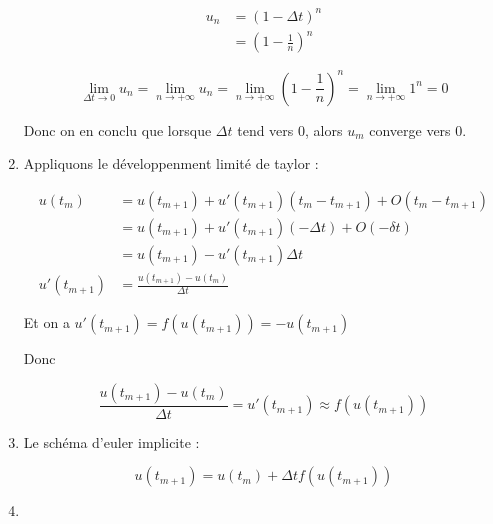 \documentclass[12pt, letterpaper]{article}
\begin{document}
\begin{enumerate}
  \begin{equation*}
    \begin{split}
      u_n & = ( 1 - \Delta t )^n \\
      & = \left( 1 - \frac{1}{n} \right)^n
    \end{split}
  \end{equation*}

  \begin{equation*}
    \lim_{\Delta t \rightarrow 0} {u_n}
    =
    \lim_{n \rightarrow +\infty} {u_n}
    =
    \lim_{n \rightarrow +\infty} {\left( 1 - \frac{1}{n} \right)^n}
    =
    \lim_{n \rightarrow +\infty} {1^n}
    =
    0
  \end{equation*}

  Donc on en conclu que lorsque $\Delta t$ tend vers 0, alors $u_m$
  converge vers 0.

\item

  Appliquons le développenment limité de taylor :

  \begin{equation*}
    \begin{split}
      u(t_m) & = u(t_{m + 1}) + u'(t_{m+1}) (t_m - t_{m+1}) + O(t_m -
      t_{m+1}) \\
      & = u(t_{m + 1}) + u'(t_{m+1}) (- \Delta t) + O(- \delta t) \\
      & = u(t_{m + 1}) - u'(t_{m+1}) \Delta t \\
      u'(t_{m+1}) & = \frac{u(t_{m + 1}) - u(t_m)}{\Delta t}
    \end{split}
  \end{equation*}

  Et on a $u'(t_{m+1}) = f(u(t_{m+1})) = - u(t_{m+1})$

  Donc

  \begin{equation*}
    \frac{u(t_{m + 1}) - u(t_m)}{\Delta t} = u'(t_{m+1}) \approx
    f(u(t_{m+1}))
  \end{equation*}


\item
  Le schéma d'euler implicite :

  \begin{equation*}
    u(t_{m+1}) = u(t_m) + \Delta t f(u(t_{m+1}))
  \end{equation*}


\item


\end{enumerate}
\end{document}
